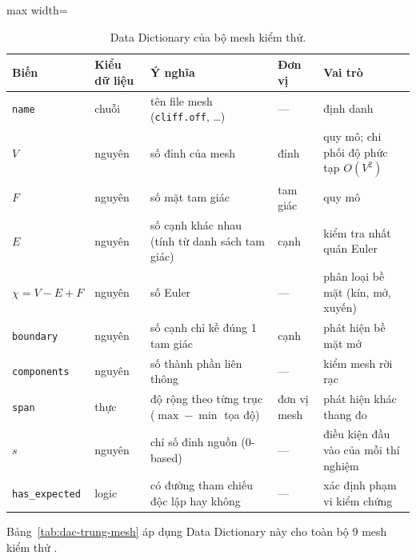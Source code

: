 \begin{table}[!t]
  \caption{Data Dictionary của bộ mesh kiểm thử.}
  \label{tab:data-dictionary}
  {\fontsize{7}{8.6}\selectfont
  \setlength{\tabcolsep}{3pt}%
  \begin{adjustbox}{max width=\textwidth}
  \begin{tabular}{@{}>{\raggedright\arraybackslash}p{54pt}
                  >{\raggedright\arraybackslash}p{52pt}
                  >{\raggedright\arraybackslash}p{146pt}
                  >{\raggedright\arraybackslash}p{36pt}
                  >{\raggedright\arraybackslash}p{104pt}@{}}
    \toprule
    \textbf{Biến} & \textbf{Kiểu dữ liệu} & \textbf{Ý nghĩa} & \textbf{Đơn vị} &
    \textbf{Vai trò} \\
    \midrule
    \texttt{name} & chuỗi & tên file mesh (\texttt{cliff.off}, \ldots) & --- &
      định danh \\
    $V$ & nguyên & số đỉnh của mesh & đỉnh & quy mô; chi phối độ phức tạp
      $O(V^2)$ \\
    $F$ & nguyên & số mặt tam giác & tam giác & quy mô \\
    $E$ & nguyên & số cạnh khác nhau (tính từ danh sách tam giác) & cạnh & kiểm tra
      nhất quán Euler \\
    $\chi=V-E+F$ & nguyên & số Euler & --- & phân loại bề mặt (kín, mở, xuyến) \\
    \texttt{boundary} & nguyên & số cạnh chỉ kề đúng 1 tam giác & cạnh & phát hiện
      bề mặt mở \\
    \texttt{components} & nguyên & số thành phần liên thông & --- & kiểm mesh rời
      rạc \\
    \texttt{span} & thực & độ rộng theo từng trục ($\max-\min$ tọa độ) & đơn vị
      mesh & phát hiện khác thang đo \\
    $s$ & nguyên & chỉ số đỉnh nguồn (0-based) & --- & điều kiện đầu vào của mỗi
      thí nghiệm \\
    \texttt{has\_expected} & logic & có đường tham chiếu độc lập hay không &
      --- & xác định phạm vi kiểm chứng \\
    \bottomrule
  \end{tabular}
  \end{adjustbox}}
\end{table}

Bảng~\ref{tab:dac-trung-mesh} áp dụng Data Dictionary này cho toàn bộ 9 mesh kiểm
thử \cite{kien2026repo}.

